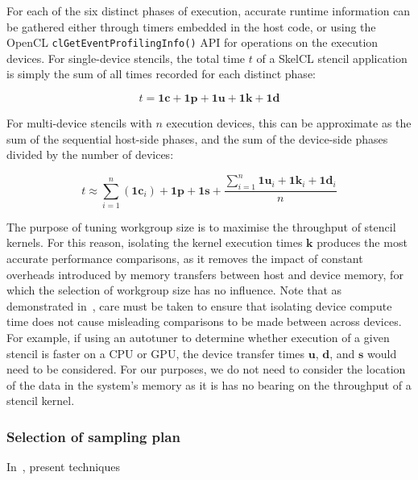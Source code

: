 For each of the six distinct phases of execution, accurate runtime
information can be gathered either through timers embedded in the host
code, or using the OpenCL \texttt{clGetEventProfilingInfo()} API for
operations on the execution devices. For single-device stencils, the
total time $t$ of a SkelCL stencil application is simply the sum of
all times recorded for each distinct phase:

\begin{equation}
t = \bm{1c} + \bm{1p} + \bm{1u} + \bm{1k} + \bm{1d}
\end{equation}

For multi-device stencils with $n$ execution devices, this can be
approximate as the sum of the sequential host-side phases, and the sum
of the device-side phases divided by the number of devices:

\begin{equation}
t \approx \sum_{i=1}^n{(\bm{1c}_{i})} + \bm{1p} + \bm{1s} +
  \frac{\sum_{i=1}^n{\bm{1u}_{i} + \bm{1k}_{i} + \bm{1d}_{i}}}{n}
\end{equation}


The purpose of tuning workgroup size is to maximise the throughput of
stencil kernels. For this reason, isolating the kernel execution times
$\bm{k}$ produces the most accurate performance comparisons, as it
removes the impact of constant overheads introduced by memory
transfers between host and device memory, for which the selection of
workgroup size has no influence. Note that as demonstrated
in~\cite{Gregg2011}, care must be taken to ensure that isolating
device compute time does not cause misleading comparisons to be made
between across devices. For example, if using an autotuner to
determine whether execution of a given stencil is faster on a CPU or
GPU, the device transfer times $\bm{u}$, $\bm{d}$, and $\bm{s}$ would
need to be considered. For our purposes, we do not need to consider
the location of the data in the system's memory as it is has no
bearing on the throughput of a stencil kernel.


\subsubsection{Selection of sampling plan}

In~\cite{Georges2007}, \citeauthor{Georges2007} present techniques

